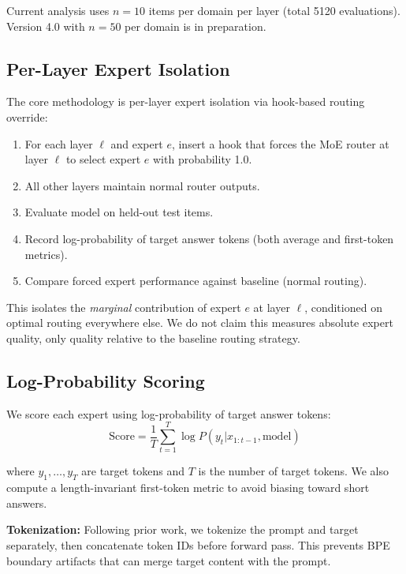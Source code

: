 \documentclass[11pt,a4paper]{article}
\begin{document}
Current analysis uses $n=10$ items per domain per layer (total 5120 evaluations). Version 4.0 with $n=50$ per domain is in preparation.

\subsection{Per-Layer Expert Isolation}

The core methodology is per-layer expert isolation via hook-based routing override:

\begin{enumerate}
\item For each layer $\ell$ and expert $e$, insert a hook that forces the MoE router at layer $\ell$ to select expert $e$ with probability 1.0.
\item All other layers maintain normal router outputs.
\item Evaluate model on held-out test items.
\item Record log-probability of target answer tokens (both average and first-token metrics).
\item Compare forced expert performance against baseline (normal routing).
\end{enumerate}

This isolates the \textit{marginal} contribution of expert $e$ at layer $\ell$, conditioned on optimal routing everywhere else. We do not claim this measures absolute expert quality, only quality relative to the baseline routing strategy.

\subsection{Log-Probability Scoring}

We score each expert using log-probability of target answer tokens:
\begin{equation}
\text{Score} = \frac{1}{T} \sum_{t=1}^{T} \log P(y_t | x_{1:t-1}, \text{model})
\end{equation}

where $y_1, \ldots, y_T$ are target tokens and $T$ is the number of target tokens. We also compute a length-invariant first-token metric to avoid biasing toward short answers.

\textbf{Tokenization:} Following prior work, we tokenize the prompt and target separately, then concatenate token IDs before forward pass. This prevents BPE boundary artifacts that can merge target content with the prompt.
\end{document}
